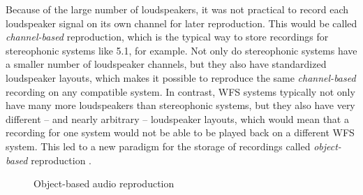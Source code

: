 Because of the large number of loudspeakers,
it was not practical to record each loudspeaker signal on its own channel
for later reproduction.
This would be called \emph{channel-based} reproduction,
which is the typical way to store recordings for stereophonic systems
like 5.1, for example.
Not only do stereophonic systems have a smaller number of loudspeaker channels,
but they also have standardized loudspeaker layouts,
which makes it possible to reproduce the same \emph{channel-based} recording
on any compatible system.
In contrast, WFS systems typically not only have many more loudspeakers
than stereophonic systems, but they also have very different
-- and nearly arbitrary --
loudspeaker layouts,
which would mean that a recording for one system
would not be able to be played back on a different WFS system.
This led to a new paradigm for the storage of recordings called
\emph{object-based} reproduction
\parencite{pereira2002mpeg4,geier2010future,geier2010object-based,tsingos2018object-based}.

\begin{figure}[htbp]
\centering
{}
\caption{Object-based audio reproduction}
\label{fig:object-based}
\end{figure}


